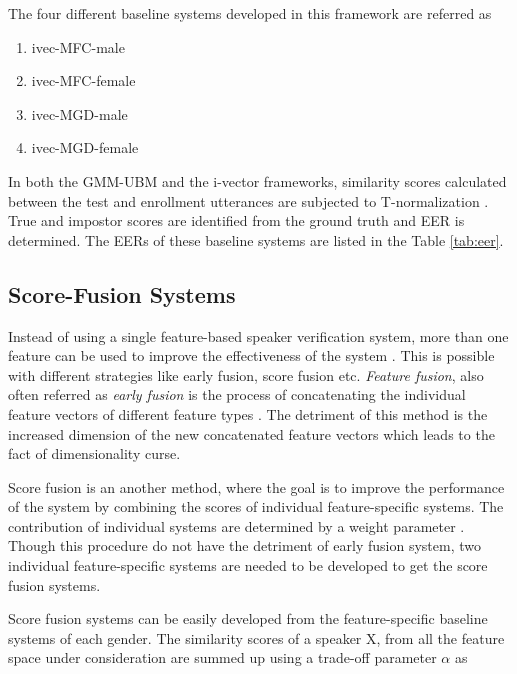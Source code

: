\documentclass{article}
\begin{document}
The four different baseline systems developed in this framework are referred as 
\begin{enumerate}
\item ivec-MFC-male
\item ivec-MFC-female
\item ivec-MGD-male
\item ivec-MGD-female
\end{enumerate}

In both the GMM-UBM and the i-vector frameworks, similarity scores calculated
between the test and enrollment utterances are subjected to T-normalization
\cite{tnorm}. True and impostor scores are identified from the ground truth and
EER is determined. The EERs of these baseline systems are listed in the Table
\ref{tab:eer}.

\subsection{Score-Fusion Systems}
\label{subsec:scoreFusion}
	Instead of using a single feature-based speaker verification system, more than one feature can be used to improve the effectiveness of the system \cite{scoreFusion, scoreFusion1}. This is possible with different strategies like early fusion, score fusion etc. {\it Feature fusion}, also often referred as {\it early fusion} is the process of concatenating the individual feature vectors of different feature types \cite{padmanInterspeech2010}. The detriment of this method is the increased dimension of the new concatenated feature vectors which leads to the fact of dimensionality curse. 

\vspace{0.25 cm}	
	Score fusion is an another method, where the goal is to improve the performance of the system by combining the scores of individual feature-specific systems. The contribution of individual systems are determined by a weight parameter \cite{scoreFusion}. Though this procedure do not have the detriment of early fusion system, two individual feature-specific systems are needed to be developed to get the score fusion systems.
	 
\vspace{0.25 cm}	
	Score fusion systems can be easily developed from the feature-specific baseline systems of each gender. The similarity scores of a speaker X, from all the feature space under consideration are summed up using a trade-off parameter $\alpha$ as  %
	
\end{document}

